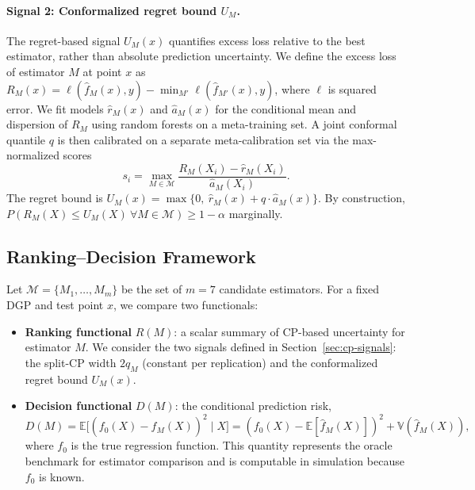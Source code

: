 \documentclass[pdflatex,sn-mathphys-ay]{sn-jnl}%
\theoremstyle{thmstyleone}%
\theoremstyle{thmstyletwo}%
\theoremstyle{thmstylethree}%
\begin{document}
\paragraph{Signal 2: Conformalized regret bound $U_M$.}
The regret-based signal $U_M(x)$ quantifies excess loss relative to the best estimator, rather than absolute prediction uncertainty. We define the excess loss of estimator $M$ at point $x$ as $R_M(x) = \ell(\hat{f}_M(x), y) - \min_{M'} \ell(\hat{f}_{M'}(x), y)$, where $\ell$ is squared error. We fit models $\hat{r}_M(x)$ and $\hat{a}_M(x)$ for the conditional mean and dispersion of $R_M$ using random forests on a meta-training set. A joint conformal quantile $q$ is then calibrated on a separate meta-calibration set via the max-normalized scores
\begin{equation}
    s_i = \max_{M \in \mathcal{M}} \frac{R_M(X_i) - \hat{r}_M(X_i)}{\hat{a}_M(X_i)}.
\end{equation}
The regret bound is $U_M(x) = \max\{0,\ \hat{r}_M(x) + q \cdot \hat{a}_M(x)\}$. By construction, $P(R_M(X) \leq U_M(X) \ \forall M \in \mathcal{M}) \geq 1-\alpha$ marginally.

\subsection{Ranking--Decision Framework}
\label{sec:framework}

Let $\mathcal{M} = \{M_1, \ldots, M_m\}$ be the set of $m = 7$ candidate estimators. For a fixed DGP and test point $x$, we compare two functionals:

\begin{itemize}
    \item \textbf{Ranking functional} $R(M)$: a scalar summary of CP-based uncertainty for estimator $M$. We consider the two signals defined in Section~\ref{sec:cp-signals}: the split-CP width $2q_M$ (constant per replication) and the conformalized regret bound $U_M(x)$.
    \item \textbf{Decision functional} $D(M)$: the conditional prediction risk,
    \begin{equation}
        D(M) = \mathbb{E}\bigl[(f_0(X) - \hat{f}_M(X))^2 \mid X\bigr] = (f_0(X) - \mathbb{E}[\hat{f}_M(X)])^2 + \mathbb{V}(\hat{f}_M(X)),
    \end{equation}
    where $f_0$ is the true regression function. This quantity represents the oracle benchmark for estimator comparison and is computable in simulation because $f_0$ is known.
\end{itemize}
\end{document}
